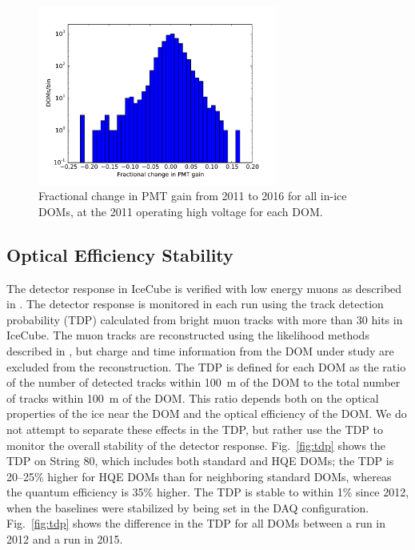 \begin{figure}[!h]
 \centering
 \includegraphics[width=0.7\textwidth]{graphics/dom/reliability/pmt_gainshift.pdf}
 \caption{Fractional change in PMT gain from 2011 to 2016 for all in-ice
   DOMs, at the 2011 operating high voltage for each DOM.}
 \label{fig:pmt_gainshift}
\end{figure}

\subsection{\label{sec:optical_stability}Optical Efficiency Stability}

The detector response in IceCube is verified with low energy muons as
described in \cite{IC3:ereco}. The detector response is monitored in each run using the track
detection probability (TDP) calculated from bright muon tracks
with more than 30 hits in IceCube. The muon 
tracks are reconstructed using the likelihood methods described in
\cite{Ahrens:2003fg}, but charge and time information from the DOM under
study are excluded from the reconstruction. The TDP is
defined for each DOM as the ratio of the number of detected tracks
within 100~m of the DOM to the total number of tracks within 100~m of
the DOM. This ratio depends both on the optical properties of the ice
near the DOM and the optical efficiency of the DOM. We do not attempt
to separate
these effects in the TDP, but rather use the TDP to monitor the
overall stability of the detector response. Fig.~\ref{fig:tdp} shows the TDP on
String 80, which includes both standard and HQE DOMs; the TDP is
20--25\% higher for HQE DOMs than for neighboring standard
DOMs, whereas the quantum efficiency is 35\% higher. The TDP is stable to within 1\% since 2012, when the baselines
were stabilized by being set in the DAQ configuration. Fig.~\ref{fig:tdp} shows
the difference in the TDP for all DOMs between a run in 2012 and a run
in 2015.

